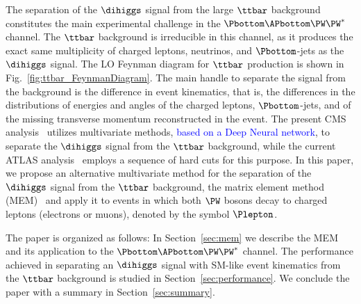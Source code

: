 The separation of the $\dihiggs$ signal from the large $\ttbar$ background constitutes the main experimental challenge in the $\Pbottom\APbottom\PW\PW^{\ast}$ channel.
The $\ttbar$ background is irreducible in this channel, as it produces the exact same multiplicity of charged leptons, neutrinos, and $\Pbottom$-jets as the $\dihiggs$ signal.
The LO Feynman diagram for $\ttbar$ production is shown in Fig.~\ref{fig:ttbar_FeynmanDiagram}.
The main handle to separate the signal from the background is the difference in event kinematics,
that is, the differences in the distributions of energies and angles of the charged leptons, $\Pbottom$-jets, and of the missing transverse momentum reconstructed in the event.
The present CMS analysis~\cite{HIG-17-006} utilizes multivariate methods, \textcolor{blue}{ based on a Deep Neural network},
to separate the $\dihiggs$ signal from the $\ttbar$ background, while the current ATLAS analysis~\cite{Aaboud:2018zhh} employs a sequence of hard cuts for this purpose.
In this paper, we propose an alternative multivariate method for the separation of the $\dihiggs$ signal from the $\ttbar$ background,
the matrix element method (MEM)~\cite{Kondo:1988yd,Kondo:1991dw} and apply it to events in which both $\PW$ bosons decay to charged leptons (electrons or muons),
denoted by the symbol $\Plepton$.

The paper is organized as follows:
In Section~\ref{sec:mem} we describe the MEM and its application to the $\Pbottom\APbottom\PW\PW^{\ast}$ channel.
The performance achieved in separating an $\dihiggs$ signal with SM-like event kinematics from the $\ttbar$ background is studied in Section~\ref{sec:performance}.
We conclude the paper with a summary in Section~\ref{sec:summary}.
